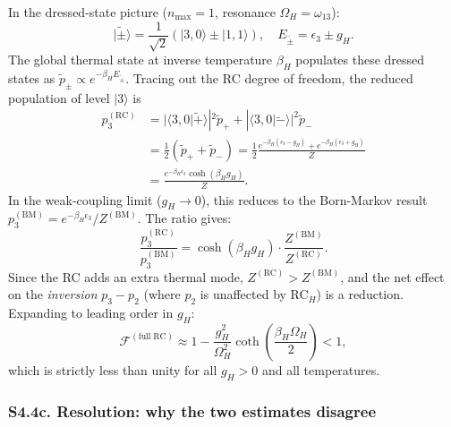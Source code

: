 \documentclass[prl,twocolumn,superscriptaddress,amsmath,amssymb]{revtex4-2}
\begin{document}
In the dressed-state picture ($n_{\max}=1$, resonance $\Omega_H = \omega_{13}$):
\begin{equation}
|\tilde\pm\rangle = \frac{1}{\sqrt{2}}(|3,0\rangle \pm |1,1\rangle), \quad E_{\tilde\pm} = \epsilon_3 \pm g_H.
\end{equation}
The global thermal state at inverse temperature $\beta_H$ populates these dressed states as $\tilde p_\pm \propto e^{-\beta_H E_{\tilde\pm}}$. Tracing out the RC degree of freedom, the reduced population of level $|3\rangle$ is
\begin{align}
p_3^{(\mathrm{RC})} &= |\langle 3,0|\tilde+\rangle|^2 \tilde p_+ + |\langle 3,0|\tilde-\rangle|^2 \tilde p_- \nonumber\\
&= \tfrac{1}{2}(\tilde p_+ + \tilde p_-) = \tfrac{1}{2}\frac{e^{-\beta_H(\epsilon_3 - g_H)} + e^{-\beta_H(\epsilon_3 + g_H)}}{Z} \nonumber\\
&= \frac{e^{-\beta_H\epsilon_3}\cosh(\beta_H g_H)}{Z}.
\end{align}
In the weak-coupling limit ($g_H \to 0$), this reduces to the Born-Markov result $p_3^{(\mathrm{BM})} = e^{-\beta_H\epsilon_3}/Z^{(\mathrm{BM})}$. The ratio gives:
\begin{equation}
\frac{p_3^{(\mathrm{RC})}}{p_3^{(\mathrm{BM})}} = \cosh(\beta_H g_H) \cdot \frac{Z^{(\mathrm{BM})}}{Z^{(\mathrm{RC})}}.
\end{equation}
Since the RC adds an extra thermal mode, $Z^{(\mathrm{RC})} > Z^{(\mathrm{BM})}$, and the net effect on the \emph{inversion} $p_3 - p_2$ (where $p_2$ is unaffected by RC$_H$) is a reduction. Expanding to leading order in $g_H$:
\begin{equation}\label{eq:S16b}
\mathcal{F}^{(\mathrm{full\; RC})} \approx 1 - \frac{g_H^2}{\Omega_H^2}\coth\!\left(\frac{\beta_H\Omega_H}{2}\right) < 1,
\end{equation}
which is strictly less than unity for all $g_H > 0$ and all temperatures.

\subsubsection{S4.4c. Resolution: why the two estimates disagree}
\end{document}
